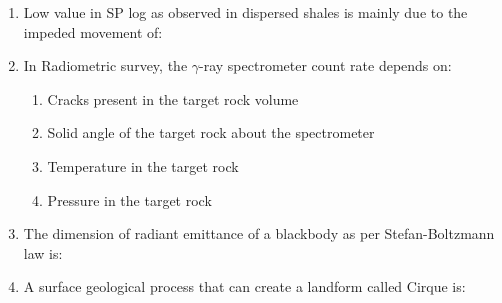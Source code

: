 \documentclass[journal,12pt,onecolumn]{IEEEtran}
\theoremstyle{remark}
\begin{document}
\begin{enumerate}
    \item Low value in SP log as observed in dispersed shales is mainly due to the impeded movement of: \hfill{}
        \begin{enumerate}
        \end{enumerate}
    
    \item In Radiometric survey, the $\gamma$-ray spectrometer count rate depends on: \hfill{}
        \begin{enumerate}
            \item Cracks present in the target rock volume
            \item Solid angle of the target rock about the spectrometer
            \item Temperature in the target rock
            \item Pressure in the target rock
        \end{enumerate}
    
    \item The dimension of radiant emittance of a blackbody as per Stefan-Boltzmann law is:\hfill{}
        \begin{enumerate}
        \end{enumerate}
    
    \item A surface geological process that can create a landform called Cirque is:\hfill{}
        \begin{enumerate}
        \end{enumerate}
    

\end{enumerate}
\end{document}
